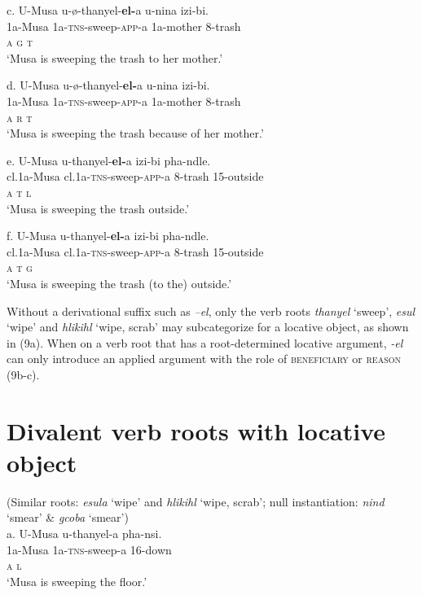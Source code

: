 \documentclass[output=paper]{langsci/langscibook}
\begin{document}
\gll   c.  U-Musa    u-ø-thanyel-\textbf{el-}a         u-nina         izi-bi. \\
         1a-Musa     1a-\textsc{tns}{}-sweep-\textsc{app}{}-a  1a-mother   8-trash\\
         \textsc{a                  g        t}\\
\glt     ‘Musa is sweeping the trash to her mother.’
\z

\gll   d.  U-Musa    u-ø-thanyel-\textbf{el-}a         u-nina        izi-bi. \\
         1a-Musa     1a-\textsc{tns}{}-sweep-\textsc{app}{}-a  1a-mother  8-trash\\
         \textsc{a                  r        t}\\
\glt     ‘Musa is sweeping the trash because of her mother.’
\z

\gll   e.  U-Musa        u-thanyel-\textbf{el-}a        izi-bi       pha-ndle. \\
         cl.1a-Musa     cl.1a-\textsc{tns}{}-sweep-\textsc{app}{}-a    8-trash       15-outside\\
         \textsc{a                      t      l}\\
\glt     ‘Musa is sweeping the trash outside.’
\z

\gll   f.  U-Musa     u-thanyel-\textbf{el-}a           izi-bi      pha-ndle. \\
         cl.1a-Musa     cl.1a-\textsc{tns}{}-sweep-\textsc{app}{}-a       8-trash    15-outside\\
         \textsc{a                      t      g}\\
\glt     ‘Musa is sweeping the trash (to the) outside.’
\z

Without a derivational suffix such as \textit{–el}, only the verb roots \textit{thanyel} ‘sweep’, \textit{esul} ‘wipe’ and \textit{hlikihl} ‘wipe, scrab’ may subcategorize for a locative object, as shown in (9a). When on a verb root that has a root-determined locative argument, \textit{{}-el} can only introduce an applied argument with the role of \textsc{beneficiary} or \textsc{reason}\textit{ }(9b-c). 

\chapter{Divalent verb roots with locative object }
       (Similar roots: \textit{esula} ‘wipe’ and \textit{hlikihl} ‘wipe, scrab’; null instantiation: \textit{nind} ‘smear’ \& \textit{gcoba} ‘smear’)\\
\gll   a.  U-Musa    u-thanyel-a           pha-nsi. \\
         1a-Musa     1a-\textsc{tns}{}-sweep-a  16-down\\
         \textsc{a                l}\\
\glt     ‘Musa is sweeping the floor.’
\z
\end{document}
